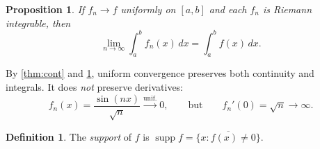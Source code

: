 \documentclass[11pt]{article}
\theoremstyle{plain}
\newtheorem{proposition}[theorem]{Proposition}
\theoremstyle{definition}
\newtheorem{definition}[theorem]{Definition}
\DeclareMathOperator{\supp}{supp}
\begin{document}
\begin{proposition}\label{prop:int}
If $f_n\to f$ uniformly on $[a,b]$ and each $f_n$ is Riemann integrable, then
\[
  \lim_{n\to\infty}\int_a^b f_n(x)\,dx = \int_a^b f(x)\,dx.
\]
\end{proposition}

By \cref{thm:cont} and \cref{prop:int}, uniform convergence preserves both
continuity and integrals. It does \emph{not} preserve derivatives:
\[
  f_n(x) = \frac{\sin(nx)}{\sqrt n} \xrightarrow{\text{unif.}} 0,
  \qquad\text{but}\qquad f_n'(0) = \sqrt{n}\to\infty.
\]

\begin{definition}
The \emph{support} of $f$ is $\supp f = \overline{\{x : f(x)\neq 0\}}$.
\end{definition}
\end{document}
